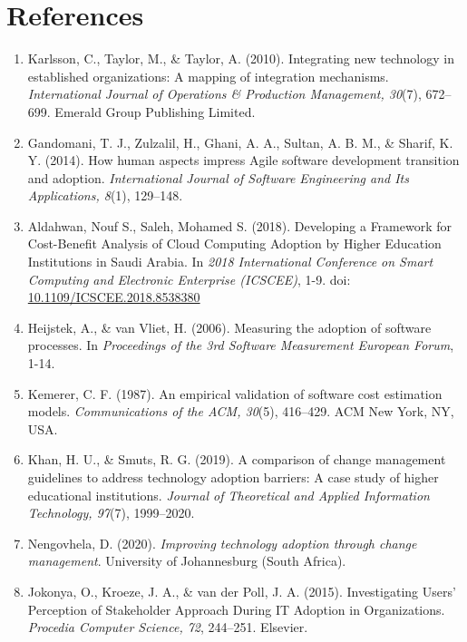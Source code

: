 \documentclass{article}
\begin{document}
\section{References}
\begin{enumerate}
    \item Karlsson, C., Taylor, M., \& Taylor, A. (2010). Integrating new technology in established organizations: A mapping of integration mechanisms. \textit{International Journal of Operations \& Production Management, 30}(7), 672--699. Emerald Group Publishing Limited.
  
    \item Gandomani, T. J., Zulzalil, H., Ghani, A. A., Sultan, A. B. M., \& Sharif, K. Y. (2014). How human aspects impress Agile software development transition and adoption. \textit{International Journal of Software Engineering and Its Applications, 8}(1), 129--148.

    \item Aldahwan, Nouf S., Saleh, Mohamed S. (2018). Developing a Framework for Cost-Benefit Analysis of Cloud Computing Adoption by Higher Education Institutions in Saudi Arabia. In \textit{2018 International Conference on Smart Computing and Electronic Enterprise (ICSCEE)}, 1-9. doi: \url{10.1109/ICSCEE.2018.8538380}

    \item Heijstek, A., \& van Vliet, H. (2006). Measuring the adoption of software processes. In \textit{Proceedings of the 3rd Software Measurement European Forum}, 1-14. 

    \item Kemerer, C. F. (1987). An empirical validation of software cost estimation models. \textit{Communications of the ACM, 30}(5), 416--429. ACM New York, NY, USA.

    \item Khan, H. U., \& Smuts, R. G. (2019). A comparison of change management guidelines to address technology adoption barriers: A case study of higher educational institutions. \textit{Journal of Theoretical and Applied Information Technology, 97}(7), 1999--2020.

    \item Nengovhela, D. (2020). \textit{Improving technology adoption through change management}. University of Johannesburg (South Africa).

    \item Jokonya, O., Kroeze, J. A., \& van der Poll, J. A. (2015). Investigating Users' Perception of Stakeholder Approach During IT Adoption in Organizations. \textit{Procedia Computer Science, 72}, 244--251. Elsevier.


\end{enumerate}
\end{document}
